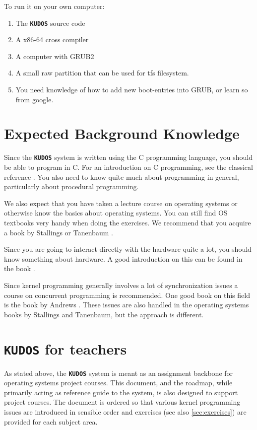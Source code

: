 \documentclass[twoside,a4paper]{report}
\newcommand{\kudos}{\texttt{\textbf{KUDOS}}}
\begin{document}
To run it on your own computer:

\begin{enumerate}
\item The \kudos{} source code
\item A x86-64 cross compiler
\item A computer with GRUB2
\item A small raw partition that can
be used for tfs filesystem.
\item You need knowledge of how
to add new boot-entries into GRUB,
or learn so from google.
\end{enumerate}

\section{Expected Background Knowledge}

Since the \kudos{} system is written using the C programming
language, you should be able to program in C. For an introduction on C
programming, see the classical reference \cite{kandr}. You also need
to know quite much about programming in general, particularly about
procedural programming.

We also expect that you have taken a lecture course on operating
systems or otherwise know the basics about operating systems. You can
still find OS textbooks very handy when doing the exercises. We
recommend that you acquire a book by Stallings \cite{stallings} or
Tanenbaum \cite{tanenbaum}.

Since you are going to interact directly with the hardware quite a
lot, you should know something about hardware. A good introduction on
this can be found in the book \cite{patterson}.

Since kernel programming generally involves a lot of synchronization
issues a course on concurrent programming is recommended. One good
book on this field is the book by Andrews \cite{andrews}. These issues
are also handled in the operating systems books by Stallings and
Tanenbaum, but the approach is different.

\section{\kudos{} for teachers}

As stated above, the \kudos{} system is meant as an assignment
backbone for operating systems project courses. This document, and
the roadmap, while primarily acting as reference guide to the system, 
is also designed to support project courses. The document is ordered 
so that various kernel programming issues are introduced in sensible 
order and exercises (see also \autoref{sec:exercises}) are provided for
each subject area.
\end{document}
